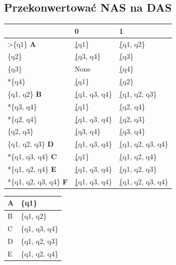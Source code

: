 \documentclass[a4paper,11pt]{article}
\begin{document}
\subsection{Przekonwertować NAS na DAS}
\begin{center}
	\begin{tabular}{|l|l|l|}
		\hline
		                               & 0                    & 1                        \\ \hline
		>\{q1\} \textbf{A}             & {\ul \{q1\}}         & {\ul \{q1, q2\}}         \\ \hline
		\{q2\}                         & {\ul \{q3, q4\}}     & {\ul \{q3\}}             \\ \hline
		\{q3\}                         & None                 & {\ul \{q4\}}             \\ \hline
		*\{q4\}                        & {\ul \{q1\}}         & {\ul \{q2\}}             \\ \hline
		\{q1, q2\} \textbf{B}          & {\ul \{q1, q3, q4\}} & {\ul \{q1, q2, q3\}}     \\ \hline
		*\{q3, q4\}                    & {\ul \{q1\}}         & {\ul \{q2, q4\}}         \\ \hline
		*\{q2, q4\}                    & {\ul \{q1, q3, q4\}} & {\ul \{q2, q3\}}         \\ \hline
		\{q2, q3\}                     & {\ul \{q3, q4\}}     & {\ul \{q3, q4\}}         \\ \hline
		\{q1, q2, q3\} \textbf{D}      & {\ul \{q1, q3, q4\}} & {\ul \{q1, q2, q3, q4\}} \\ \hline
		*\{q1, q3, q4\} \textbf{C}     & {\ul \{q1\}}         & {\ul \{q1, q2, q4\}}     \\ \hline
		*\{q1, q2, q4\} \textbf{E}     & {\ul \{q1, q3, q4\}} & {\ul \{q1, q2, q3\}}     \\ \hline
		*\{q1, q2, q3, q4\} \textbf{F} & {\ul \{q1, q3, q4\}} & {\ul \{q1, q2, q3, q4\}} \\ \hline
	\end{tabular}
	\hspace{1cm}
	\begin{tabular}{|l|l|}
		\hline
		A & \{q1\}             \\ \hline
		B & \{q1, q2\}         \\ \hline
		C & \{q1, q3, q4\}     \\ \hline
		D & \{q1, q2, q3\}     \\ \hline
		E & \{q1, q2, q4\}     \\ \hline

\end{tabular}
\end{center}
\end{document}

